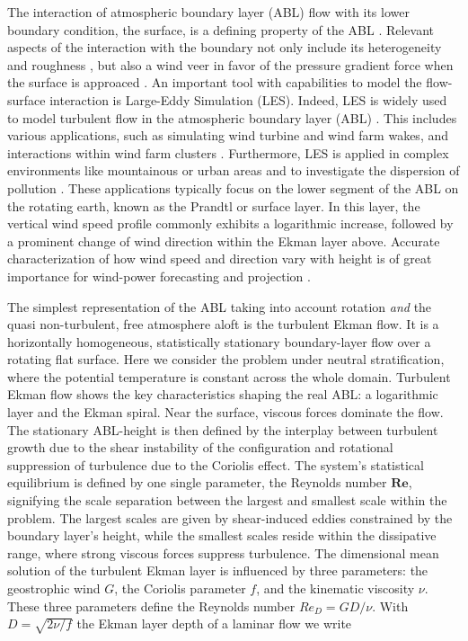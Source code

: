 \documentclass[a4paper,11pt]{article}
\newcommand{\todo}[1]{\textcolor{red}{$[$#1$]$}}
\newcommand{\RE}{\mathbf{Re}}
\begin{document}
The interaction of atmospheric boundary layer  (ABL) flow with its lower boundary condition, the surface, is a defining property of the ABL \citep{stull:1988}. Relevant aspects of the interaction with the boundary not only include its heterogeneity \citep{avissar:MWR1989,giorgi:RG1997,claussen:BM1991,garratt:BM1990} and roughness \citep{monin:ARF1970,brutsaert:WRR1975,raupach:AMR1991,kostelecky:JFM2024}, but also a wind veer in favor of the pressure gradient force when the surface is approaced \citep{ekman:AMA1905}. An important tool with capabilities to model the flow-surface interaction is Large-Eddy Simulation (LES). Indeed, LES is widely used to model turbulent flow in the atmospheric boundary layer (ABL) \citep{stoll2020large}. This includes various applications, such as simulating wind turbine and wind farm wakes, and interactions within wind farm clusters \citep{porte2011large,mehta2014large,breton2017survey}. Furthermore, LES is applied in complex environments like mountainous or urban areas \citep{stoll2020large,garcia2018predictive} and to investigate the dispersion of pollution \cite{han2018large}. These applications typically focus on the lower segment of the ABL on the rotating earth, known as the Prandtl or surface layer. In this layer, the vertical wind speed profile commonly exhibits a logarithmic increase, followed by a prominent change of wind direction within the Ekman layer above. Accurate characterization of how wind speed and direction vary with height is of great importance for wind-power forecasting and projection \citep{optis2014moving}.

The simplest representation of the ABL taking into account rotation \emph{and} the quasi non-turbulent, free atmosphere aloft is the turbulent Ekman flow. It is a horizontally homogeneous, statistically stationary boundary-layer flow over a rotating flat surface. Here we consider the problem under neutral stratification, where the potential temperature is constant across the whole domain. Turbulent Ekman flow shows the key characteristics shaping the real ABL: a logarithmic layer and the Ekman spiral. Near the surface, viscous forces dominate the flow. The stationary ABL-height is then defined by the interplay between turbulent growth due to the shear instability of the configuration \citep{lilly1966instability} and rotational suppression of turbulence due to the Coriolis effect. The system's statistical equilibrium is defined by one single parameter, the Reynolds number $\RE$, signifying the scale separation between the largest and smallest scale within the problem. The largest scales are given by shear-induced eddies constrained by the boundary layer's height, while the smallest scales reside within the dissipative range, where strong viscous forces suppress turbulence. The dimensional mean solution of the turbulent Ekman layer is influenced by three parameters: the geostrophic wind $G$, the Coriolis parameter $f$, and the kinematic viscosity $\nu$. These three parameters define the Reynolds number $Re_D = GD/\nu$. With $D=\sqrt{2\nu/f}$ the Ekman layer depth of a laminar flow we write
\end{document}
